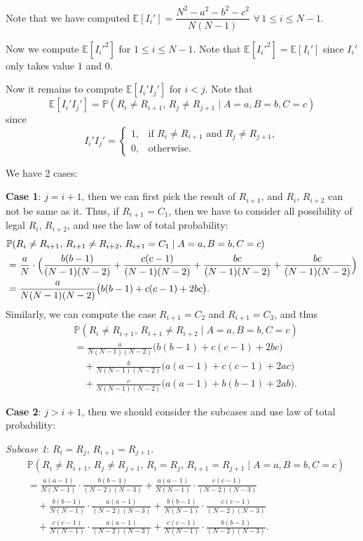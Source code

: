 \documentclass[a4paper,12pt]{article}
\begin{document}
\begin{itemize}
    Note that we have computed $\mathbb{E}[I_i'] = \dfrac{N^2-a^2-b^2-c^2}{N(N-1)}$ $\forall\, 1 \leq i \leq N-1$.

    Now we compute $\mathbb{E}[I_i'^2]$ for $1 \leq i \leq N-1$. Note that $\mathbb{E}[I_i'^2] = \mathbb{E}[I_i']$ since $I_i'$ only takes value $1$ and $0$.

    Now it remains to compute $\mathbb{E}[I_i'I_j']$ for $i < j$. Note that
    \[
        \mathbb{E}[I_i'I_j'] = \mathbb{P}(R_i \neq R_{i+1},\, R_j \neq R_{j+1} \mid A=a, B=b, C=c)
    \]
    since
    \[
        I_i'I_j' = \begin{cases} 1, & \text{if } R_i \neq R_{i+1} \text{ and } R_j \neq R_{j+1}, \\ 0, & \text{otherwise.} \end{cases}
    \]

    We have 2 cases:

    \textbf{Case 1}: $j = i+1$, then we can first pick the result of $R_{i+1}$, and $R_i$, $R_{i+2}$ can not be same as it. Thus, if $R_{i+1} = C_1$, then we have to consider all possibility of legal $R_i$, $R_{i+2}$, and use the law of total probability:
    \begin{align*}
        &\mathbb{P}(R_i \neq R_{i+1},\, R_{i+1} \neq R_{i+2},\, R_{i+1} = C_1 \mid A=a, B=b, C=c) \\
        &= \frac{a}{N} \cdot \Bigl(\frac{b(b-1)}{(N-1)(N-2)} + \frac{c(c-1)}{(N-1)(N-2)}
           + \frac{bc}{(N-1)(N-2)} + \frac{bc}{(N-1)(N-2)}\Bigr) \\
        &= \frac{a}{N(N-1)(N-2)}\bigl(b(b-1) + c(c-1) + 2bc\bigr).
    \end{align*}
    Similarly, we can compute the case $R_{i+1} = C_2$ and $R_{i+1} = C_3$, and thus
    \begin{align*}
        &\mathbb{P}(R_i \neq R_{i+1},\, R_{i+1} \neq R_{i+2} \mid A=a, B=b, C=c) \\
        &= \frac{a}{N(N-1)(N-2)}\bigl(b(b-1)+c(c-1)+2bc\bigr) \\
        &\quad + \frac{b}{N(N-1)(N-2)}\bigl(a(a-1)+c(c-1)+2ac\bigr) \\
        &\quad + \frac{c}{N(N-1)(N-2)}\bigl(a(a-1)+b(b-1)+2ab\bigr).
    \end{align*}

    \textbf{Case 2}: $j > i+1$, then we should consider the subcases and use law of total probability:

    \textit{Subcase 1}: $R_i = R_j$, $R_{i+1} = R_{j+1}$.
    \begin{align*}
        &\mathbb{P}(R_i \neq R_{i+1},\, R_j \neq R_{j+1},\, R_i = R_j,\, R_{i+1} = R_{j+1} \mid A=a, B=b, C=c) \\
        &= \frac{a(a-1)}{N(N-1)}\cdot\frac{b(b-1)}{(N-2)(N-3)}
         + \frac{a(a-1)}{N(N-1)}\cdot\frac{c(c-1)}{(N-2)(N-3)} \\
        &\quad + \frac{b(b-1)}{N(N-1)}\cdot\frac{a(a-1)}{(N-2)(N-3)}
         + \frac{b(b-1)}{N(N-1)}\cdot\frac{c(c-1)}{(N-2)(N-3)} \\
        &\quad + \frac{c(c-1)}{N(N-1)}\cdot\frac{a(a-1)}{(N-2)(N-3)}
         + \frac{c(c-1)}{N(N-1)}\cdot\frac{b(b-1)}{(N-2)(N-3)}.
    \end{align*}


\end{itemize}
\end{document}
